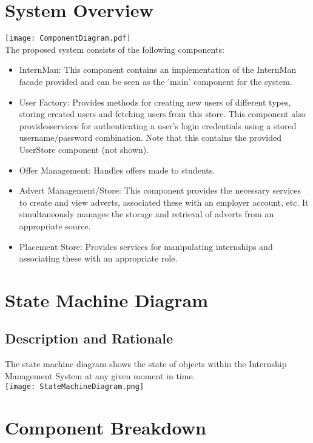\documentclass{l3deliverable}
\begin{document}
\section{System Overview}
\texttt{[image: ComponentDiagram.pdf]}\\
The proposed system consists of the following components:
\begin{itemize}
\item{InternMan: This component contains an implementation of the InternMan facade provided and can be seen as the 'main' component for the system. }
\item{User Factory: Provides methods for creating new users of different types, storing created users and fetching users from this store. This component also providesservices for authenticating a user's login credentials using a stored username/password combination. Note that this contains the provided UserStore component (not shown).}
\item{Offer Management: Handles offers made to students.}
\item{Advert Management/Store: This component provides the necessary services to create and view adverts, associated these with an employer account, etc. It simultaneously
manages the storage and retrieval of adverts from an appropriate source.}
\item{Placement Store: Provides services for manipulating internships and associating these with an appropriate role.}
\end{itemize}



\section{State Machine Diagram}
\subsection{Description and Rationale}
The state machine diagram shows the state of objects within the Internship Management System at any given moment in time.\\
\texttt{[image: StateMachineDiagram.png]}\\


\section{Component Breakdown}
\end{document}
